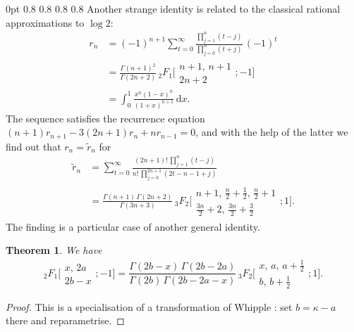 \documentclass[12pt,reqno]{amsart}
\newtheorem{theorem}{Theorem}%
\let\wt\widetilde
\renewcommand{\d}{{\mathrm d}}
\begin{document}
  0pt 0.8\textwidth
  0pt 0.8\textwidth
  0pt 0.8\textwidth
  0pt 0.8\textwidth
  0pt \textwidth
Another strange identity is related to the classical rational approximations to $\log2$:
\begin{align*}
r_n
&=(-1)^{n+1}\sum_{t=0}^\infty\frac{\prod_{j=1}^n(t-j)}{\prod_{j=0}^n(t+j)}\,(-1)^t
\\
&=\frac{\Gamma(n+1)^2}{\Gamma(2n+2)}\,{}_2F_1\biggl[\begin{matrix} n+1, \, n+1 \\ 2n+2 \end{matrix}; -1\biggr]
\\
&=\int_0^1\frac{x^n(1-x)^n}{(1+x)^{n+1}}\,\d x.
\end{align*}
The sequence satisfies the recurrence equation $(n+1)r_{n+1}-3(2n+1)r_n+nr_{n-1}=0$, and with the help of the latter we find out that
$r_n=\wt r_n$ for
\begin{align*}
\wt r_n
&=\sum_{t=0}^\infty\frac{(2n+1)!\,\prod_{j=1}^n(t-j)}{n!\,\prod_{j=0}^{2n+1}(2t-n-1+j)}
\\
&=\frac{\Gamma(n+1)\,\Gamma(2n+2)}{\Gamma(3n+3)}\,{}_3F_2\biggl[\begin{matrix} n+1, \, \frac n2+\frac12, \, \frac n2+1 \\[2pt]
\frac{3n}2+2, \, \frac{3n}2+\frac32 \end{matrix}; 1\biggr].
\end{align*}
The finding is a particular case of another general identity.

\begin{theorem}
\label{th-ln2}
We have
\begin{equation}
{}_2F_1\biggl[\begin{matrix} x, \, 2a \\ 2b-x \end{matrix}; -1\biggr]
=\frac{\Gamma(2b-x)\,\Gamma(2b-2a)}{\Gamma(2b)\,\Gamma(2b-2a-x)}
\,{}_3F_2\biggl[\begin{matrix} x, \, a, \, a+\frac12 \\[2pt] b, \, b+\frac12 \end{matrix}; 1\biggr].
\label{id-ln2}
\end{equation}
\end{theorem}

\begin{proof}
This is a specialisation of a transformation of 
Whipple \cite[Sec.~4.6, Eq.~(3)]{Ba35}: set $b=\kappa-a$ there
and reparametrise.
\end{proof}
\end{document}
